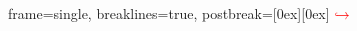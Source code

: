 \renewcommand{\labelenumi}{\arabic{enumi}.}
\renewcommand{\labelenumii}{\arabic{enumii}.}
\renewcommand{\labelenumiii}{\arabic{enumiii}.}

\renewcommand\labelitemi{—}
\renewcommand\labelitemii{—}
\renewcommand\labelitemiii{—}

\usepackage{tabularx}
\usepackage{longtable}
\usepackage{ltxtable}

\newcommand*{\thead}[1]{\multicolumn{1}{|c|}{\normalsize #1}}

\usepackage{listings}
\usepackage{xcolor}
\lstset
{
    frame=single,
    breaklines=true,
    postbreak=\raisebox{0ex}[0ex][0ex]
    {
        \ensuremath{\color{red}\hookrightarrow\space}
    }
}

\usepackage{tocloft}
\renewcommand{\cftsecleader}{\cftdotfill{\cftdotsep}}
\renewcommand{\cftsecfont}{\mdseries}
\renewcommand{\cftsecpagefont}{\mdseries}
\renewcommand{\cfttoctitlefont}{\mdseries}

\makeatletter
\renewcommand{\@biblabel}[1]{#1.}
\makeatother



